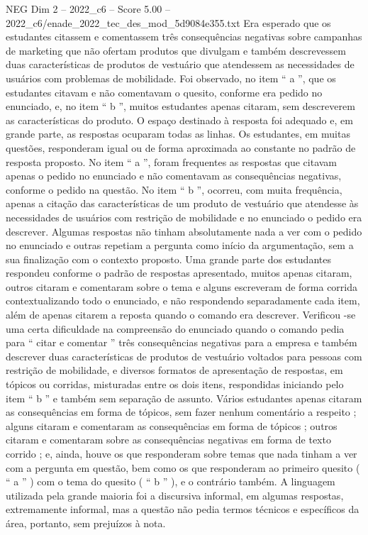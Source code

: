 \begin{textsample}{NEG Dim 2 – 2022\_c6 – Score 5.00 – 2022\_c6/enade\_2022\_tec\_des\_mod\_5d9084e355.txt}
Era esperado que os estudantes citassem e comentassem três consequências negativas sobre campanhas de marketing que não ofertam produtos que divulgam e também descrevessem duas características de produtos de vestuário que atendessem as necessidades de usuários com problemas de mobilidade.
Foi observado, no item “ a ”, que os estudantes citavam e não comentavam o quesito, conforme era pedido no enunciado, e, no item “ b ”, muitos estudantes apenas citaram, sem descreverem as características do produto.
O espaço destinado à resposta foi adequado e, em grande parte, as respostas ocuparam todas as linhas.
Os estudantes, em muitas questões, responderam igual ou de forma aproximada ao constante no padrão de resposta proposto.
No item “ a ”, foram frequentes as respostas que citavam apenas o pedido no enunciado e não comentavam as consequências negativas, conforme o pedido na questão.
No item “ b ”, ocorreu, com muita frequência, apenas a citação das características de um produto de vestuário que atendesse às necessidades de usuários com restrição de mobilidade e no enunciado o pedido era descrever.
Algumas respostas não tinham absolutamente nada a ver com o pedido no enunciado e outras repetiam a pergunta como início da argumentação, sem a sua finalização com o contexto proposto.
Uma grande parte dos estudantes respondeu conforme o padrão de respostas apresentado, muitos apenas citaram, outros citaram e comentaram sobre o tema e alguns escreveram de forma corrida contextualizando todo o enunciado, e não respondendo separadamente cada item, além de apenas citarem a reposta quando o comando era descrever.
Verificou -se uma certa dificuldade na compreensão do enunciado quando o comando pedia para “ citar e comentar ” três consequências negativas para a empresa e também descrever duas características de produtos de vestuário voltados para pessoas com restrição de mobilidade, e diversos formatos de apresentação de respostas, em tópicos ou corridas, misturadas entre os dois itens, respondidas iniciando pelo item “ b ” e também sem separação de assunto.
Vários estudantes apenas citaram as consequências em forma de tópicos, sem fazer nenhum comentário a respeito ; alguns citaram e comentaram as consequências em forma de tópicos ; outros citaram e comentaram sobre as consequências negativas em forma de texto corrido ; e, ainda, houve os que responderam sobre temas que nada tinham a ver com a pergunta em questão, bem como os que responderam ao primeiro quesito ( “ a ” ) com o tema do quesito ( “ b ” ), e o contrário também.
A linguagem utilizada pela grande maioria foi a discursiva informal, em algumas respostas, extremamente informal, mas a questão não pedia termos técnicos e específicos da área, portanto, sem prejuízos à nota.

\end{textsample}
